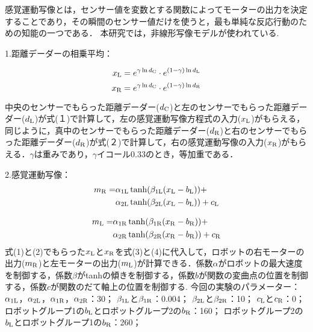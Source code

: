 感覚運動写像とは，センサー値を変数とする関数によってモーターの出力を決定することであり，その瞬間のセンサー値だけを使うと，最も単純な反応行動のための知能の一つである．
本研究では，非線形写像モデルが使われている.

1.距離デーダーの相乗平均：

\begin{equation}
  x_{\rm L} = e^{\gamma \ln d_{\rm C}} \cdot e^{(1-\gamma)\ln d_{\rm L}} 
\end{equation}
\begin{equation}
  x_{\rm R} = e^{\gamma \ln d_{\rm C}} \cdot e^{(1-\gamma)\ln d_{\rm R}} 
\end{equation}

中央のセンサーでもらった距離デーダー($d_{\rm C}$)と左のセンサーでもらった距離デーダー($d_{\rm L}$)が式(１)で計算して，左の感覚運動写像方程式の入力($x_{\rm L}$)がもらえる，同じように，真中のセンサーでもらった距離デーダー($d_{\rm R}$)と右のセンサーでもらった距離デーダー($d_{\rm R}$)が式(２)で計算して，右の感覚運動写像の入力($x_{\rm R}$)がもらえる．$\gamma$は重みであり，$\gamma$イコール0.33のとき，等加重である．

2.感覚運動写像：
\begin{equation}
\begin{aligned}
  m_{\rm R} = &\alpha_{1{\rm L}} \tanh(\beta_{1{\rm L}}(x_{\rm L} - b_{\rm L})) + \\
        &\alpha_{2{\rm L}} \tanh(\beta_{2{\rm L}}(x_{\rm L} - b_{\rm L})) + c_{\rm L}
\end{aligned}
\end{equation}

\begin{equation}
\begin{aligned}
  m_{\rm L} = &\alpha_{1{\rm R}} \tanh(\beta_{1{\rm R}}(x_{\rm R} - b_{\rm R})) + \\
        &\alpha_{2{\rm R}}\tanh(\beta_{2{\rm R}}(x_{\rm R} - b_{\rm R})) + c_{\rm R}
\end{aligned}
\end{equation}
式(1)と(2)でもらった$x_{\rm L}$と$x_{\rm R}$を式(3)と(4)に代入して，ロボットの右モーターの出力($m_{\rm R}$)と左モーターの出力($m_{\rm L}$)が計算できる．係数$\alpha$がロボットの最大速度を制御する，係数$\beta$が{\rm tanh}の傾きを制御する，係数$b$が関数の変曲点の位置を制御する，係数$c$が関数のだて軸上の位置を制御する. 
今回の実験のパラメーター：
$\alpha_{1{\rm L}}$，$\alpha_{2{\rm L}}$，$\alpha_{1{\rm R}}$，$\alpha_{2{\rm R}}$：30；
$\beta_{1{\rm L}}$と$\beta_{1{\rm R}}$：0.004；
$\beta_{2{\rm L}}$と$\beta_{2{\rm R}}$：10；
$c_{\rm L}$と$c_{\rm R}$：0；
ロボットグループ1の$b_{\rm L}$とロボットグループ2の$b_{\rm R}$：160；
ロボットグループ2の$b_{\rm L}$とロボットグループ1の$b_{\rm R}$：260；
